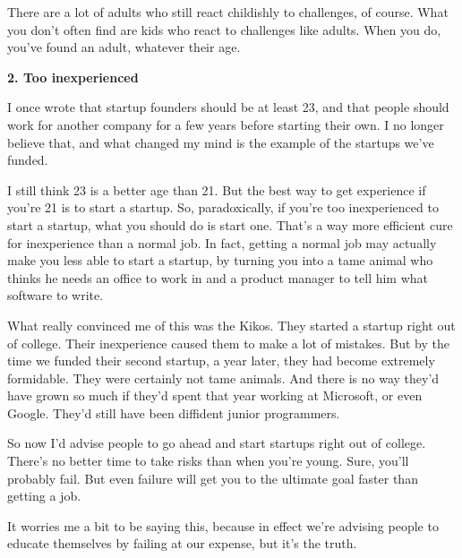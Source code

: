 There
                    are a lot of adults who still react childishly to
                    challenges, of course. What you don't often find are kids
                    who react to challenges like adults. When you do, you've
                    found an adult, whatever their age.

\textbf{2. Too inexperienced}

I once wrote that startup founders should be at
                    least 23, and that people should work for another company
                    for a few years before starting their own. I no longer
                    believe that, and what changed my mind is the example of the
                    startups we've funded.

I still think 23 is a
                    better age than 21. But the best way to get experience if
                    you're 21 is to start a startup. So, paradoxically, if
                    you're too inexperienced to start a startup, what you should
                    do is start one. That's a way more efficient cure for
                    inexperience than a normal job. In fact, getting a normal
                    job may actually make you less able to start a startup, by
                    turning you into a tame animal who thinks he needs an office
                    to work in and a product manager to tell him what software
                    to write.

What really convinced me of this was
                    the Kikos. They started a startup right out of college.
                    Their inexperience caused them to make a lot of mistakes.
                    But by the time we funded their second startup, a year
                    later, they had become extremely formidable. They were
                    certainly not tame animals. And there is no way they'd have
                    grown so much if they'd spent that year working at
                    Microsoft, or even Google. They'd still have been diffident
                    junior programmers.

So now I'd advise people to
                    go ahead and start startups right out of college. There's no
                    better time to take risks than when you're young. Sure,
                    you'll probably fail. But even failure will get you to the
                    ultimate goal faster than getting a job.

It
                    worries me a bit to be saying this, because in effect we're
                    advising people to educate themselves by failing at our
                    expense, but it's the truth.


